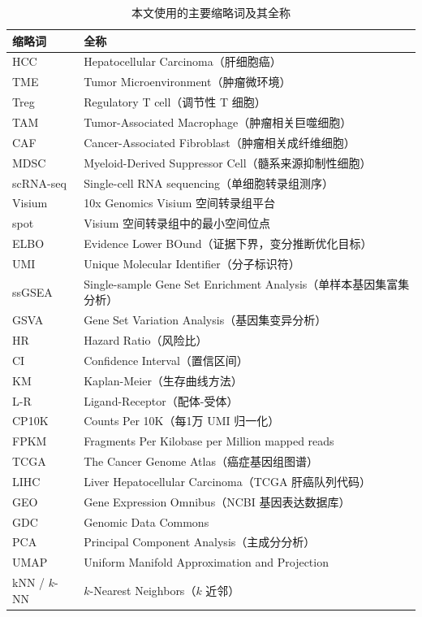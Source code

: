 \documentclass[12pt, a4paper]{ctexart}
\begin{document}
\begin{table}[H]
\centering
\begin{tabular}{ll}
\toprule
\textbf{缩略词} & \textbf{全称} \\
\midrule
HCC & Hepatocellular Carcinoma（肝细胞癌） \\
TME & Tumor Microenvironment（肿瘤微环境） \\
Treg & Regulatory T cell（调节性 T 细胞） \\
TAM & Tumor-Associated Macrophage（肿瘤相关巨噬细胞） \\
CAF & Cancer-Associated Fibroblast（肿瘤相关成纤维细胞） \\
MDSC & Myeloid-Derived Suppressor Cell（髓系来源抑制性细胞） \\
scRNA-seq & Single-cell RNA sequencing（单细胞转录组测序） \\
Visium & 10x Genomics Visium 空间转录组平台 \\
spot & Visium 空间转录组中的最小空间位点 \\
ELBO & Evidence Lower BOund（证据下界，变分推断优化目标） \\
UMI & Unique Molecular Identifier（分子标识符） \\
ssGSEA & Single-sample Gene Set Enrichment Analysis（单样本基因集富集分析） \\
GSVA & Gene Set Variation Analysis（基因集变异分析） \\
HR & Hazard Ratio（风险比） \\
CI & Confidence Interval（置信区间） \\
KM & Kaplan-Meier（生存曲线方法） \\
L-R & Ligand-Receptor（配体-受体） \\
CP10K & Counts Per 10K（每1万 UMI 归一化） \\
FPKM & Fragments Per Kilobase per Million mapped reads \\
TCGA & The Cancer Genome Atlas（癌症基因组图谱） \\
LIHC & Liver Hepatocellular Carcinoma（TCGA 肝癌队列代码） \\
GEO & Gene Expression Omnibus（NCBI 基因表达数据库） \\
GDC & Genomic Data Commons \\
PCA & Principal Component Analysis（主成分分析） \\
UMAP & Uniform Manifold Approximation and Projection \\
kNN / $k$-NN & $k$-Nearest Neighbors（$k$ 近邻） \\
\bottomrule
\end{tabular}
\caption{本文使用的主要缩略词及其全称}
\label{tab:abbreviations}
\end{table}
\end{document}
